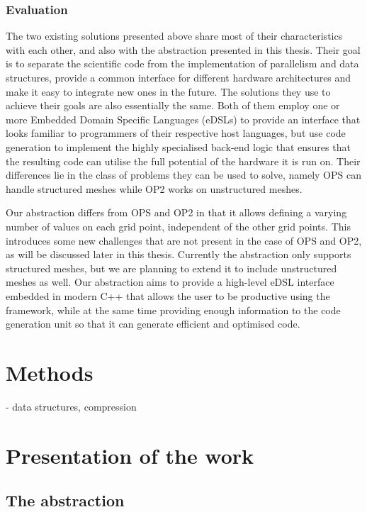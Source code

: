 \documentclass[fontsize=11pt, appendixprefix=true]{scrreprt}
\begin{document}
\subsection{Evaluation}

The two existing solutions presented above share most of their characteristics
with each other, and also with the abstraction presented in this thesis. Their
goal is to separate the scientific code from the implementation of parallelism
and data structures, provide a common interface for different hardware
architectures and make it easy to integrate new ones in the future. The
solutions they use to achieve their goals are also essentially the same. Both of
them employ one or more Embedded Domain Specific Languages (eDSLs) to provide an
interface that looks familiar to programmers of their respective host languages,
but use code generation to implement the highly specialised back-end logic that
ensures that the resulting code can utilise the full potential of the hardware
it is run on. Their differences lie in the class of problems they can be used to
solve, namely OPS can handle structured meshes while OP2 works on unstructured
meshes.

Our abstraction differs from OPS and OP2 in that it allows defining a varying
number of values on each grid point, independent of the other grid points. This
introduces some new challenges that are not present in the case of OPS and OP2,
as will be discussed later in this thesis. Currently the abstraction only
supports structured meshes, but we are planning to extend it to include
unstructured meshes as well. Our abstraction aims to provide a high-level eDSL
interface embedded in modern C++ that allows the user to be productive using the
framework, while at the same time providing enough information to the code
generation unit so that it can generate efficient and optimised code.

\chapter{Methods}

- data structures, compression

\chapter{Presentation of the work}

\section{The abstraction}
\end{document}
